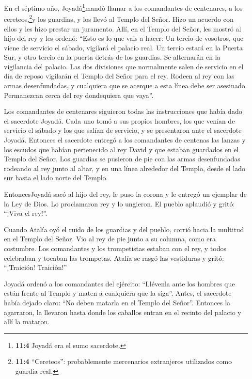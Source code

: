  En el séptimo año, Joyadá\footnote{\textbf{11:4} Joyadá era
  el sumo sacerdote.}mandó llamar a los comandantes de centenares, a los
cereteos,\footnote{\textbf{11:4} ``Cereteos'': probablemente mercenarios
  extranjeros utilizados como guardia real.}y los guardias, y los llevó
al Templo del Señor. Hizo un acuerdo con ellos y les hizo prestar un
juramento. Allí, en el Templo del Señor, les mostró al hijo del rey
 y les ordenó: ``Esto es lo que vais a hacer: Un tercio de
vosotros, que viene de servicio el sábado, vigilará el palacio real.
 Un tercio estará en la Puerta Sur, y otro tercio en la
puerta detrás de los guardias. Se alternarán en la vigilancia del
palacio.  Las dos divisiones que normalmente salen de
servicio en el día de reposo vigilarán el Templo del Señor para el rey.
 Rodeen al rey con las armas desenfundadas, y cualquiera que
se acerque a esta línea debe ser asesinado. Permanezcan cerca del rey
dondequiera que vaya''.

 Los comandantes de centenares siguieron todas las
instrucciones que había dado el sacerdote Joyadá. Cada uno tomó a sus
propios hombres, los que venían de servicio el sábado y los que salían
de servicio, y se presentaron ante el sacerdote Joyadá. 
Entonces el sacerdote entregó a los comandantes de centenas las lanzas y
los escudos que habían pertenecido al rey David y que estaban guardados
en el Templo del Señor.  Los guardias se pusieron de pie
con las armas desenfundadas rodeando al rey junto al altar, y en una
línea alrededor del Templo, desde el lado sur hasta el lado norte del
Templo.

 EntoncesJoyadá sacó al hijo del rey, le puso la corona y
le entregó un ejemplar de la Ley de Dios. Lo proclamaron rey y lo
ungieron. El pueblo aplaudió y gritó: ``¡Viva el rey!''.

 Cuando Atalía oyó el ruido de los guardias y del pueblo,
corrió hacia la multitud en el Templo del Señor.  Vio al
rey de pie junto a su columna, como era costumbre. Los comandantes y los
trompetistas estaban con el rey, y todos celebraban y tocaban las
trompetas. Atalía se rasgó las vestiduras y gritó: ``¡Traición!
Traición!''

 Joyadá ordenó a los comandantes del ejército: ``Llévenla
ante los hombres que están frente al Templo y maten a cualquiera que la
siga''. Antes, el sacerdote había dejado claro: ``No deben matarla en el
Templo del Señor''.  Entonces la agarraron, la llevaron
hasta donde los caballos entran en el recinto del palacio y allí la
mataron.

